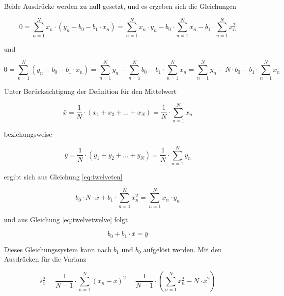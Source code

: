 \noindent Beide Ausdr\"{u}cke werden zu null gesetzt, und es ergeben sich die Gleichungen

\begin{equation}\label{eq:twelveten}
0=\sum _{n=1}^{N}x_{n} \cdot \left(y_{n} -b_{0} -b_{1} \cdot x_{n} \right) =\sum _{n=1}^{N}x_{n} \cdot y_{n}  -b_{0} \cdot \sum _{n=1}^{N}x_{n}  -b_{1} \cdot \sum _{n=1}^{N}x_{n}^{2}
\end{equation}

\noindent und 

\begin{equation}\label{eq:twelveeleven}
0=\sum _{n=1}^{N}\left(y_{n} -b_{0} -b_{1} \cdot x_{n} \right) =\sum _{n=1}^{N}y_{n}  -\sum _{n=1}^{N}b_{0}  -b_{1} \cdot \sum _{n=1}^{N}x_{n}  =\sum _{n=1}^{N}y_{n}  -N\cdot b_{0} -b_{1} \cdot \sum _{n=1}^{N}x_{n}
\end{equation}

\noindent Unter Ber\"{u}cksichtigung der Definition f\"{u}r den Mittelwert

\begin{equation}\label{eq:twelvetwelve}
\bar{x}=\dfrac{1}{N} \cdot \left(x_{1} +x_{2} +...+x_{N} \right)=\dfrac{1}{N} \cdot \sum _{n=1}^{N}x_{n}
\end{equation}

\noindent beziehungsweise 

\begin{equation}\label{eq:twelvethirteen}
\bar{y}=\dfrac{1}{N} \cdot \left(y_{1} +y_{2} +...+y_{N} \right)=\dfrac{1}{N} \cdot \sum _{n=1}^{N}y_{n}
\end{equation}

\noindent ergibt sich aus Gleichung \eqref{eq:twelveten}

\begin{equation}\label{eq:twelvefourteen}
b_{0} \cdot N\cdot \bar{x}+b_{1} \cdot \sum _{n=1}^{N}x_{n}^{2}  =\sum _{n=1}^{N}x_{n} \cdot y_{n}
\end{equation}

\noindent und aus Gleichung \eqref{eq:twelvetwelve} folgt

\begin{equation}\label{eq:twelvefifteen}
b_{0} +b_{1} \cdot \bar{x}=\bar{y}
\end{equation}

\noindent Dieses Gleichungssystem kann nach $b_{1}$ und $b_{0}$ aufgel\"{o}st werden. Mit den Ausdr\"{u}cken f\"{u}r die Varianz

\begin{equation}\label{eq:twelvesixteen}
s_{x}^{2} =\dfrac{1}{N-1} \cdot \sum _{n=1}^{N}\left(x_{n} -\bar{x}\right)^{2}  =\dfrac{1}{N-1} \cdot \left(\sum _{n=1}^{N}x_{n}^{2}  -N\cdot \bar{x}^{2} \right)
\end{equation}

